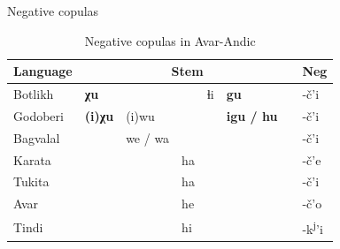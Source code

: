\begin{frame}{Negative copulas}



\begin{table}[]
\caption{Negative copulas in Avar-Andic}
\label{tab:neg}
\begin{tabular}{l|llllll|l}
\multicolumn{1}{c|}{Language}                                & \multicolumn{6}{c|}{Stem}                                                                & \multicolumn{1}{c}{Neg} \\ \hline
\rowcolor[HTML]{EFEFEF} 
Botlikh                                                      & \textbf{χu}         &         &    & {\color[HTML]{FE0000} ɬi} & \textbf{gu}       &     & -č'i                    \\
Godoberi                                                     & \textbf{(i)χu}      & (i)wu   &    &                           & \textbf{igu / hu} &     & -č'i                    \\
\rowcolor[HTML]{EFEFEF} 
Bagvalal                                                     &                     & we / wa &    &                           &                   &     & -č'i                    \\
Karata                                                       &                     &         & ha &                           &                   &     & -č'e                    \\
\rowcolor[HTML]{EFEFEF} 
Tukita    &                     &         & ha &                           &                   &     & -č'i                    \\
Avar                                                         &                     &         & he &                           &                   &     & -č'o                    \\
\rowcolor[HTML]{EFEFEF} 
Tindi                                                        &                     &         & hi &                           &                   &     & -k\textsuperscript{j}'i                   \\

\end{tabular}
\end{table}
\end{frame}

